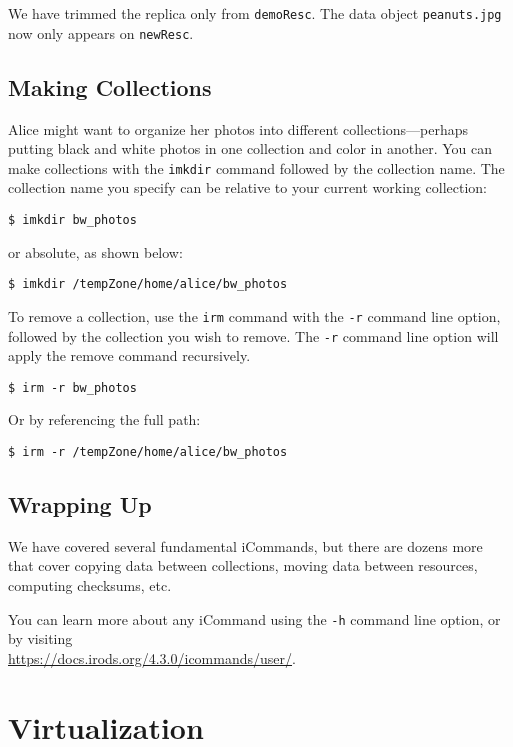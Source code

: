 \documentclass[10pt,oneside]{memoir}
\begin{document}
We have trimmed the replica only from \texttt{demoResc}. The data object \texttt{peanuts.jpg} now only appears on \texttt{newResc}.

\section{Making Collections}

Alice might want to organize her photos into different collections---perhaps putting black and white photos in one collection and color in another. You can make collections with the \texttt{imkdir} command followed by the collection name. The collection name you specify can be relative to your current working collection:

\begin{lstlisting}
$ imkdir bw_photos
\end{lstlisting}

or absolute, as shown below:

\begin{lstlisting}
$ imkdir /tempZone/home/alice/bw_photos
\end{lstlisting}

To remove a collection, use the \texttt{irm} command with the \texttt{-r} command line option, followed by the collection you wish to remove. The \texttt{-r} command line option will apply the remove command recursively.

\begin{lstlisting}
$ irm -r bw_photos
\end{lstlisting}

Or by referencing the full path:

\begin{lstlisting}
$ irm -r /tempZone/home/alice/bw_photos
\end{lstlisting}

\section{Wrapping Up}

We have covered several fundamental iCommands, but there are dozens more that cover copying data between collections, moving data between resources, computing checksums, etc.

You can learn more about any iCommand using the \texttt{-h} command line option, or by visiting \\
\url{https://docs.irods.org/4.3.0/icommands/user/}.

\chapter{Virtualization}
\end{document}
